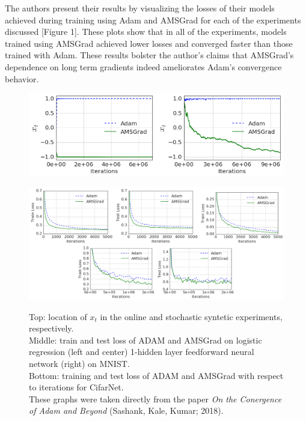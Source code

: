 \documentclass[letterpaper, 10 pt, conference]{ieeeconf}  %
\begin{document}
The authors present their results by visualizing the losses of their models achieved during training using Adam and AMSGrad for each of the experiments discussed [Figure 1]. These plots show that in all of the experiments, models trained using AMSGrad achieved lower losses and converged faster than those trained with Adam. These results bolster the author's claims that AMSGrad's dependence on long term gradients indeed ameliorates Adam's convergence behavior.
\begin{figure}
\begin{minipage}{1\textwidth}
\centering
\begin{minipage}{0.55\textwidth}
  \centering
  \includegraphics[width=1\linewidth]{OG_synthetic.png}
  \label{fig:test2}
\end{minipage}%
\centering
\break
\begin{minipage}{0.9\textwidth}
  \centering
  \includegraphics[width=1\linewidth]{OG_results_nets.png}
  \label{fig:test2}
\end{minipage}%
\end{minipage}
\caption[]{Top: location of $x_t$ in the online and stochastic syntetic experiments, respectively. \\
Middle: train and test loss of ADAM and AMSGrad on logistic regression (left and center) 1-hidden layer feedforward neural network (right) on MNIST.\\
Bottom: training and test loss of ADAM and AMSGrad with respect to iterations for CifarNet.\\
These graphs were taken directly from the paper \emph{On the Conergence of Adam and Beyond} (Sashank, Kale, Kumar; 2018).} 
\end{figure}    
\end{document}
